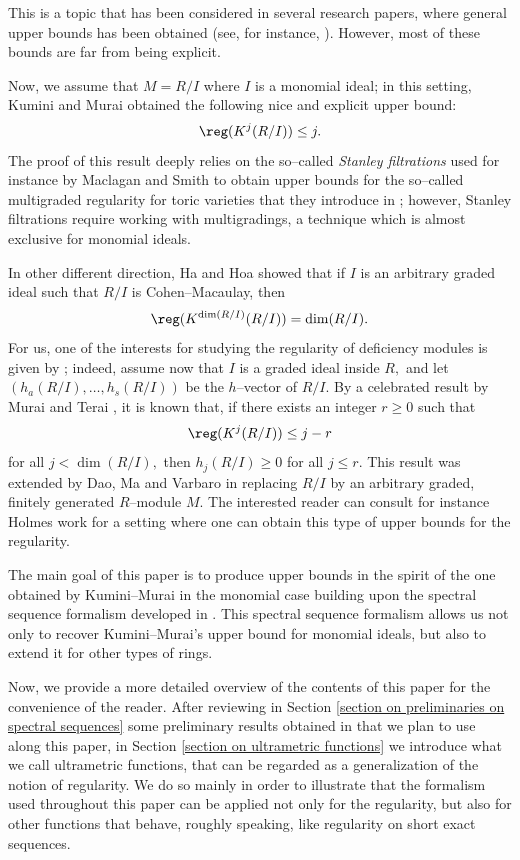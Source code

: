 \documentclass[11pt]{amsart}
\begin{document}
This is a topic that has been considered in several research papers, where general upper bounds has been obtained (see, for instance, \cite{HoaHyry2006,BrodmannLinhSeiler2013,ChardinHaHoa2011}). However, most of these bounds are far from being explicit.

Now, we assume that $M=R/I$ where $I$ is a monomial ideal; in this setting, Kumini and Murai \cite{KumminiMurai2011} obtained the following nice and explicit upper bound:
\[
\reg (K^j (R/I))\leq j.
\]
The proof of this result deeply relies on the so--called \textit{Stanley filtrations} used for instance by Maclagan and Smith \cite{MaclaganSmith2005} to obtain upper bounds for the so--called multigraded regularity for toric varieties that they introduce in \cite{MaclaganSmith2004}; however, Stanley filtrations require working with multigradings, a technique which is almost exclusive for monomial ideals.

In other different direction, Ha and Hoa \cite[Proposition 2.3]{HaHoa2008} showed that if $I$ is an arbitrary graded ideal such that $R/I$ is Cohen--Macaulay, then
\[
\reg (K^{\dim (R/I)}(R/I))=\dim (R/I).
\]
For us, one of the interests for studying the regularity of deficiency modules is given by \cite{DaoMaVarbaro}; indeed, assume now that $I$ is a graded ideal inside $R,$ and let $(h_a (R/I),\ldots, h_s (R/I))$ be the $h$--vector of $R/I.$ By a celebrated result by Murai and Terai \cite[Theorem 1.4]{MuraiTeraihvectors}, it is known that, if there exists an integer $r\geq 0$ such that
\[
\reg (K^j (R/I))\leq j-r
\]
for all $j<\dim (R/I),$ then $h_j (R/I)\geq 0$ for all $j\leq r.$ This result was extended by Dao, Ma and Varbaro in \cite[Theorem 2.8]{DaoMaVarbaro} replacing $R/I$ by an arbitrary graded, finitely generated $R$--module $M.$ The interested reader can consult for instance Holmes work \cite[Corollary 5.5]{HolmesgeneralizedSerrecondition} for a setting where one can obtain this type of upper bounds for the regularity.

The main goal of this paper is to produce upper bounds in the spirit of the one obtained by Kumini--Murai in the monomial case building upon the spectral sequence formalism developed in \cite{AlvarezBoixZarzuelaspectralsequences}. This spectral sequence formalism allows us not only to recover Kumini--Murai's upper bound for monomial ideals, but also to extend it for other types of rings.

Now, we provide a more detailed overview of the contents of this paper for the convenience of the reader. After reviewing in Section \ref{section on preliminaries on spectral sequences} some preliminary results obtained in \cite{AlvarezBoixZarzuelaspectralsequences} that we plan to use along this paper, in Section \ref{section on ultrametric functions} we introduce what we call ultrametric functions, that can be regarded as a generalization of the notion of regularity. We do so mainly in order to illustrate that the formalism used throughout this paper can be applied not only for the regularity, but also for other functions that behave, roughly speaking, like regularity on short exact sequences.
\end{document}
